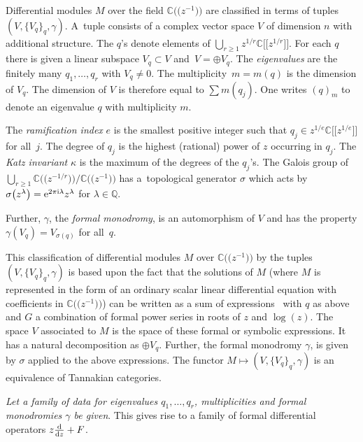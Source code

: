 \documentclass[10pt,a4paper]{amsart}
\numberwithin{equation}{section}
\begin{document}
Differential modules $M$ over the field $\mathbb{C}\bigl( \!\bigl(z^{-1}\bigr)\!\bigr)$ are classified
in terms of tuples $(V, \{V_q\}_q, \gamma)$. A~tuple consists of a complex vector space $V$ of dimension $n$ with additional structure.
The $q$'s denote elements of $ \bigcup_{r\geq 1} z^{1/r}\mathbb{C}\bigl[\!\bigl[z^{1/r}\bigr]\!\bigr]$. For each $q$ there is given a linear
subspace $V_q\subset V$ and~${V=\oplus V_q}$. The {\it eigenvalues } are the finitely many $q_1,\dots ,q_r$ with $V_{q}\neq 0$.
The multiplicity~${m=m(q)}$ is the dimension of $V_q$. The dimension of $V$ is therefore equal to $\sum m(q_j)$.
One writes $(q)_m$ to denote an eigenvalue $q$ with multiplicity $m$.

The {\it ramification index} $e$ is the smallest positive integer such that $q_j\in z^{1/e}\mathbb{C}\bigl[\!\bigl[z^{1/e}\bigr]\!\bigr]$ for all~$j$. The degree of
$q_j$ is the highest (rational) power of $z$ occurring in $q_j$. The {\it Katz invariant} $\kappa$ is the maximum
of the degrees of the $q_j$'s. The Galois group of $\bigcup_{r\geq 1}\mathbb{C}\bigl(\!\bigl( z^{-1/r}\bigr)\!\bigr)/ \mathbb{C}\bigl(\!\bigl(z^{-1}\bigr)\!\bigr)$ has a~topological generator $\sigma$ which acts by $\sigma \bigl(z^\lambda\bigr)={\rm e}^{2\pi {\rm i} \lambda}z^\lambda$ for $\lambda \in \mathbb{Q}$.

Further, $\gamma$, the {\it formal monodromy}, is an automorphism of $V$ and has the property
$\gamma (V_q)=V_{\sigma(q)}$ for all~$q$.

This classification of differential modules $M$ over $\mathbb{C}\bigl(\!\bigl(z^{-1}\bigr)\!\bigr)$
 by the tuples $(V,\{V_q\}_q,\gamma)$ is based upon the fact that the solutions of $M$ \big(where $M$ is represented in the form of an ordinary
 scalar linear differential equation with coefficients in $\mathbb{C}\bigl(\!\bigl(z^{-1}\bigr)\!\bigr)$\big) \color{black} can be written as a sum of
 expressions~ with $q$ as above and $G$ a combination of formal power series
 in roots of $z$ and $\log (z)$. The space $V$ associated to $M$ is the space of these formal or symbolic expressions. It has a natural decomposition
 as $\oplus V_q$. Further, the formal monodromy $\gamma$, is given by $\sigma$ applied to the above expressions.
The functor $M\mapsto (V, \{V_q\}_q, \gamma)$ is an equivalence of Tannakian categories.


{\it Let a family of data for eigenvalues $q_1,\dots, q_r$, multiplicities and formal monodromies $\gamma$ be given}. This gives rise to a family of formal differential operators $z\frac{{\rm d}}{{\rm d}z}+F$.
\end{document}
